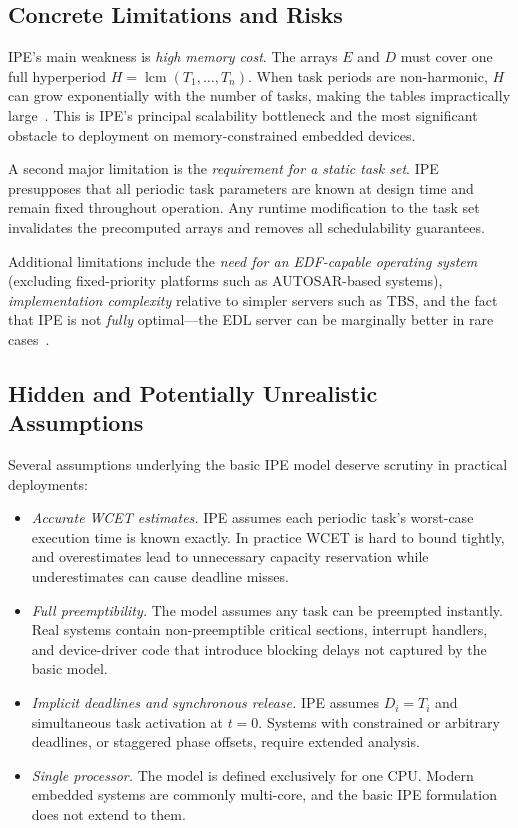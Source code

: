 \documentclass[conference]{IEEEtran}
\begin{document}
\subsection{Concrete Limitations and Risks}

IPE's main weakness is \emph{high memory cost}. The arrays
$E$ and $D$ must cover one full hyperperiod
$H = \operatorname{lcm}(T_1,\ldots,T_n)$. When task periods
are non-harmonic, $H$ can grow exponentially with the number
of tasks, making the tables impractically
large~\cite{buttazzo2011}. This is IPE's principal
scalability bottleneck and the most significant obstacle to
deployment on memory-constrained embedded devices.

A second major limitation is the \emph{requirement for a
static task set}. IPE presupposes that all periodic task
parameters are known at design time and remain fixed
throughout operation. Any runtime modification to the task
set invalidates the precomputed arrays and removes all
schedulability guarantees.

Additional limitations include the \emph{need for an
EDF-capable operating system} (excluding fixed-priority
platforms such as AUTOSAR-based systems),
\emph{implementation complexity} relative to simpler servers
such as TBS, and the fact that IPE is not \emph{fully}
optimal---the EDL server can be marginally better in rare
cases~\cite{spuri1996}.

\subsection{Hidden and Potentially Unrealistic Assumptions}

Several assumptions underlying the basic IPE model deserve
scrutiny in practical deployments:

\begin{itemize}
  \item \textit{Accurate WCET estimates.} IPE assumes each
    periodic task's worst-case execution time is known
    exactly. In practice WCET is hard to bound tightly, and
    overestimates lead to unnecessary capacity reservation
    while underestimates can cause deadline misses.
  \item \textit{Full preemptibility.} The model assumes any
    task can be preempted instantly. Real systems contain
    non-preemptible critical sections, interrupt handlers,
    and device-driver code that introduce blocking delays not
    captured by the basic model.
  \item \textit{Implicit deadlines and synchronous release.}
    IPE assumes $D_i = T_i$ and simultaneous task activation
    at $t = 0$. Systems with constrained or arbitrary
    deadlines, or staggered phase offsets, require extended
    analysis.
  \item \textit{Single processor.} The model is defined
    exclusively for one CPU. Modern embedded systems are
    commonly multi-core, and the basic IPE formulation does
    not extend to them.
\end{itemize}
\end{document}

